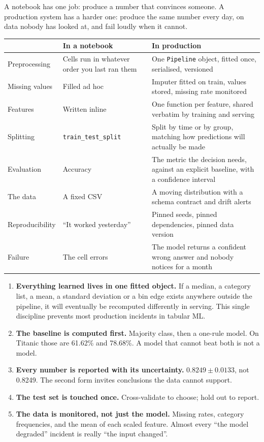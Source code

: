 \documentclass[11pt,a4paper]{article}
\begin{document}
A notebook has one job: produce a number that convinces someone. A production system has a
harder one: produce the same number every day, on data nobody has looked at, and fail
loudly when it cannot.

\begin{tabularx}{\textwidth}{@{}l X X@{}}
\toprule
\rowcolor{tablehead} & \textbf{In a notebook} & \textbf{In production} \\
\midrule
Preprocessing & Cells run in whatever order you last ran them & One \lstinline|Pipeline| object, fitted once, serialised, versioned \\
Missing values & Filled ad hoc & Imputer fitted on train, values stored, missing rate monitored \\
Features & Written inline & One function per feature, shared verbatim by training and serving \\
Splitting & \lstinline|train_test_split| & Split by time or by group, matching how predictions will actually be made \\
Evaluation & Accuracy & The metric the decision needs, against an explicit baseline, with a confidence interval \\
The data & A fixed CSV & A moving distribution with a schema contract and drift alerts \\
Reproducibility & ``It worked yesterday'' & Pinned seeds, pinned dependencies, pinned data version \\
Failure & The cell errors & The model returns a confident wrong answer and nobody notices for a month \\
\bottomrule
\end{tabularx}


\begin{enumerate}\itemsep4pt
  \item \textbf{Everything learned lives in one fitted object.} If a median, a category
        list, a mean, a standard deviation or a bin edge exists anywhere outside the
        pipeline, it will eventually be recomputed differently in serving. This single
        discipline prevents most production incidents in tabular ML.
  \item \textbf{The baseline is computed first.} Majority class, then a one-rule model. On
        Titanic those are 61.62\% and 78.68\%. A model that cannot beat both is not a model.
  \item \textbf{Every number is reported with its uncertainty.} $0.8249 \pm 0.0133$, not
        0.8249. The second form invites conclusions the data cannot support.
  \item \textbf{The test set is touched once.} Cross-validate to choose; hold out to report.
  \item \textbf{The data is monitored, not just the model.} Missing rates, category
        frequencies, and the mean of each scaled feature. Almost every ``the model degraded''
        incident is really ``the input changed''.
\end{enumerate}
\end{document}
